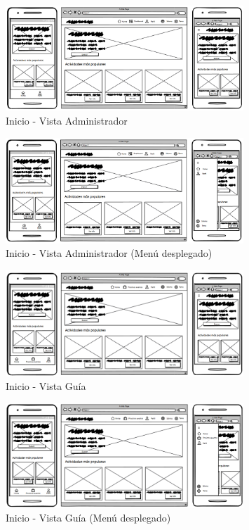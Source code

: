 \begin{figure}[H]
	\centering
	\includegraphics[width=0.8\textwidth]{5-AnalisisDelSistemaDeInformacion/InterfacesDeUsuario/Inicio/inicio-admin.png}
	\caption{Inicio - Vista Administrador }
\end{figure}

\begin{figure}[H]
	\centering
	\includegraphics[width=0.8\textwidth]{5-AnalisisDelSistemaDeInformacion/InterfacesDeUsuario/Inicio/inicio-admin-menu.png}
	\caption{Inicio - Vista Administrador (Menú desplegado)}
\end{figure}

\begin{figure}[H]
	\centering
	\includegraphics[width=0.8\textwidth]{5-AnalisisDelSistemaDeInformacion/InterfacesDeUsuario/Inicio/inicio-guia.png}
	\caption{Inicio - Vista Guía }
\end{figure}

\begin{figure}[H]
	\centering
	\includegraphics[width=0.8\textwidth]{5-AnalisisDelSistemaDeInformacion/InterfacesDeUsuario/Inicio/inicio-guia-menu.png}
	\caption{Inicio - Vista Guía (Menú desplegado)}
\end{figure}

